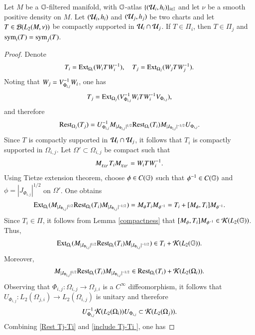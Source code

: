 \documentclass[leqno]{amsart}
\begin{document}
	
	\begin{lemma}\label{symi=symj}
		Let $M$ be a $\mathbb{G}$-filtered manifold, with $\mathbb{G}$-atlas $\{({\mathcal U}_{i},h_{i})\}_{i\in\mathbb I}$ and let $\nu$ be a smooth positive density on $M$. Let $({\mathcal U}_{i},h_{i})$ and $({\mathcal U}_{j},h_{j})$ be two charts and let $T\in{\mathcal B}(L_{2}(M,\nu))$ be compactly supported in ${\mathcal U}_{i}\cap{\mathcal U}_{j}$. If $T\in\Pi_{i}$, then $T\in\Pi_{j}$ and ${\rm sym}_{i}(T)={\rm sym}_{j}(T)$.
	\end{lemma}
	\begin{proof}
		Denote $$T_{i}={\rm Ext}_{\Omega_{i}}(W_{i}T W_{i}^{-1}),\quad T_{j}={\rm Ext}_{\Omega_{j}}(W_{j}T W_{j}^{-1}).$$
		Noting that $W_{j}=V_{\Phi_{i,j}}^{-1} W_{i}$, one has $$T_{j}={\rm Ext}_{\Omega_{j}}(V_{\Phi_{i,j}}^{-1} W_{i}T W_{i}^{-1} V_{\Phi_{i,j}}),$$ 
		and therefore
		\begin{align}\label{Rest Tj-Ti}
			{\rm Rest}_{\Omega_{j}}(T_{j})=
			U_{\Phi_{i,j}}^{-1} M_{|J_{\Phi_{i,j}}|^{1/2}}{\rm Rest}_{\Omega_{i}}(T_{i}) M_{|J_{\Phi_{i,j}}|^{-1/2}} U_{\Phi_{i,j}}.
		\end{align}
		Since $T$ is compactly supported in ${\mathcal U}_{i}\cap{\mathcal U}_{j}$, it follows that $T_{i}$ is compactly supported in $\Omega_{i,j}$. Let $\Omega'\subset\Omega_{i,j}$ be compact such that
		$$M_{\chi_{\Omega'}}T_{i}M_{\chi_{\Omega'}}=W_{i}T W_{i}^{-1}.$$
		Using Tietze extension theorem, choose $\phi\in C(\mathbb{G})$ such that $\phi^{-1}\in C(\mathbb{G})$ and $\phi=|J_{\Phi_{i,j}}|^{1/2}$ on $\Omega'$. One obtains
		\begin{align*}
			{\rm Ext}_{\Omega_{i}}(M_{|J_{\Phi_{i,j}}|^{1/2}}{\rm Rest}_{\Omega_{i}}(T_{i}) M_{|J_{\Phi_{i,j}}|^{-1/2}})=M_{\phi}T_{i} M_{\phi^{-1}}=T_{i}+[M_{\phi},T_{i}]M_{\phi^{-1}}.
		\end{align*}
		Since $T_{i}\in\Pi$, it follows from Lemma \ref{compactness} that $[M_{\phi},T_{i}]M_{\phi^{-1}}\in{\mathcal K}(L_{2}(\mathbb{G}))$. Thus,
		\begin{align*}
			{\rm Ext}_{\Omega_{i}}(M_{|J_{\Phi_{i,j}}|^{ 1/2}}{\rm Rest}_{\Omega_{i}}(T_{i}) M_{|J_{\Phi_{i,j}}|^{- 1/2}})\in T_{i}+{\mathcal K}(L_{2}(\mathbb{G})).
		\end{align*}
		Moreover,
		\begin{align}\label{include Tj-Ti }
			M_{|J_{\Phi_{i,j}}|^{1/2}}{\rm Rest}_{\Omega_{i}}(T_{i}) M_{|J_{\Phi_{i,j}}|^{-1/2}}\in {\rm Rest}_{\Omega_{i}}(T_{i})+{\mathcal K}(L_{2}(\Omega_{i})).
		\end{align}
		Observing that $\Phi_{i,j}:\Omega_{i,j}\to\Omega_{j,i}$ is a $C^{\infty}$ diffeomorphism, it follows that $U_{\Phi_{i,j}}:L_{2}(\Omega_{j,i})\to L_{2}(\Omega_{i,j})$ is unitary and therefore $$U_{\Phi_{i,j}}^{-1} {\mathcal K}(L_{2}(\Omega_{i}))U_{\Phi_{i,j}}\subset {\mathcal K}(L_{2}(\Omega_{j})).$$ Combining \eqref{Rest Tj-Ti} and \eqref{include Tj-Ti }, one has

\end{proof}
\end{document}
